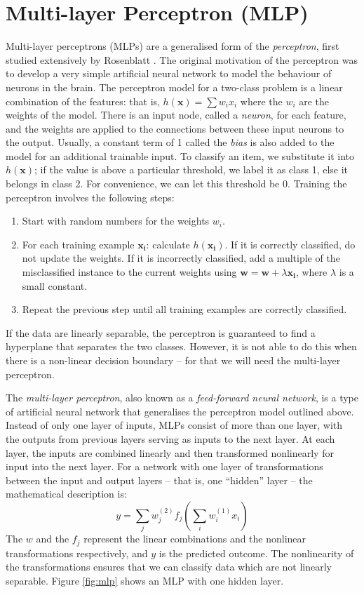 \section{Multi-layer Perceptron (MLP)}
Multi-layer perceptrons (MLPs) are a generalised form of the
\textit{perceptron}, first
studied extensively by Rosenblatt \cite{Rosenblatt1962}. The original
motivation of the perceptron 
was to develop a very simple artificial neural network to model the
behaviour of neurons in the brain. The perceptron model for a two-class
problem is a linear combination of the features: that is,
$h(\mathbf{x}) = \sum w_i x_i$ where the $w_i$ are the weights of the model.
There is an input node, called a \textit{neuron}, for each feature, and the
weights are applied to the connections between these input neurons to the
output.
Usually, a constant term of 1 called the \textit{bias} is also added to the
model for an additional trainable input. To classify an item, we substitute it
into $h(\mathbf{x})$; if the value is above a particular threshold, we label it
as class 1, else it belongs in class 2. For convenience, we can let this
threshold be 0. Training the perceptron involves the following steps:
\begin{enumerate}
\item Start with random numbers for the weights $w_i$.
\item For each training example $\mathbf{x_i}$: calculate $h(\mathbf{x_i})$.
If it is correctly classified, do not update the weights.
If it is incorrectly classified, add a multiple of the misclassified
instance to the current weights using
$\mathbf{w} = \mathbf{w} + \lambda \mathbf{x_i}$, where $\lambda$ is a small
constant.
\item Repeat the previous step until all training examples are correctly
classified.
\end{enumerate}
If the data are linearly separable, the perceptron is guaranteed to find a
hyperplane that separates the two classes. However, it is not able to do this
when there is a non-linear decision boundary -- for that we will need the
multi-layer perceptron.

The \textit{multi-layer perceptron}, also known as a
\textit{feed-forward neural network}, is a type of artificial neural network
that generalises the perceptron model outlined above. Instead of only one layer
of inputs, MLPs consist of more than one layer, with the outputs from previous
layers serving as inputs to the next layer. At each layer, the inputs are
combined linearly and then transformed nonlinearly for input into the next
layer. For a network with one layer of transformations between the input and
output layers -- that is, one ``hidden'' layer -- the mathematical description
is:
\begin{equation*}
y = \sum_j w^{(2)}_j f_j \left(\sum_i w^{(1)}_i x_i\right)
\end{equation*}
The $w$ and the $f_j$ represent the linear combinations and the nonlinear
transformations respectively, and $y$ is the predicted outcome.
The nonlinearity of the transformations ensures
that we can classify data which are not linearly separable. Figure
\ref{fig:mlp} shows an MLP with one hidden layer.

